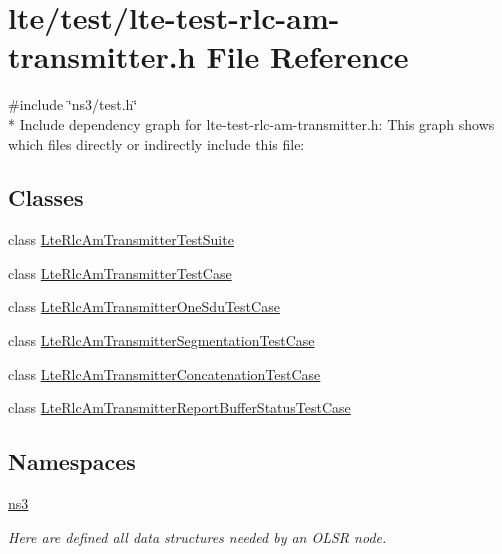 \hypertarget{lte-test-rlc-am-transmitter_8h}{}\section{lte/test/lte-\/test-\/rlc-\/am-\/transmitter.h File Reference}
\label{lte-test-rlc-am-transmitter_8h}
{\ttfamily \#include \char`\"{}ns3/test.\+h\char`\"{}}\\*
Include dependency graph for lte-\/test-\/rlc-\/am-\/transmitter.h\+:
This graph shows which files directly or indirectly include this file\+:
\subsection*{Classes}
\begin{DoxyCompactItemize}
\item 
class \hyperlink{classLteRlcAmTransmitterTestSuite}{Lte\+Rlc\+Am\+Transmitter\+Test\+Suite}
\item 
class \hyperlink{classLteRlcAmTransmitterTestCase}{Lte\+Rlc\+Am\+Transmitter\+Test\+Case}
\item 
class \hyperlink{classLteRlcAmTransmitterOneSduTestCase}{Lte\+Rlc\+Am\+Transmitter\+One\+Sdu\+Test\+Case}
\item 
class \hyperlink{classLteRlcAmTransmitterSegmentationTestCase}{Lte\+Rlc\+Am\+Transmitter\+Segmentation\+Test\+Case}
\item 
class \hyperlink{classLteRlcAmTransmitterConcatenationTestCase}{Lte\+Rlc\+Am\+Transmitter\+Concatenation\+Test\+Case}
\item 
class \hyperlink{classLteRlcAmTransmitterReportBufferStatusTestCase}{Lte\+Rlc\+Am\+Transmitter\+Report\+Buffer\+Status\+Test\+Case}
\end{DoxyCompactItemize}
\subsection*{Namespaces}
\begin{DoxyCompactItemize}
\item 
 \hyperlink{namespacens3}{ns3}
\begin{DoxyCompactList}\small\item\em Here are defined all data structures needed by an O\+L\+SR node. \end{DoxyCompactList}\end{DoxyCompactItemize}
